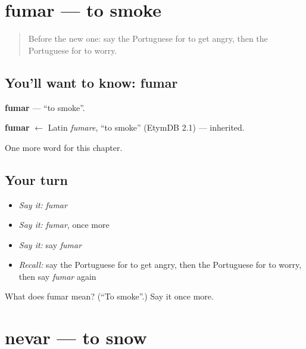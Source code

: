 \section[fumar]{fumar — to smoke}

\label{lesson:PT-C233-fumar}



\begin{quote}
Before the new one: say the Portuguese for to get angry, then the Portuguese for to worry.
\end{quote}

\subsection*{You'll want to know: fumar}
\textbf{fumar} — \textquotedblleft{}to smoke\textquotedblright{}.

\begin{cousinweb}
\textbf{fumar} $\leftarrow$ Latin \emph{fumare}, \textquotedblleft{}to smoke\textquotedblright{} (EtymDB 2.1) — inherited.
\end{cousinweb}

\begin{grammarlens}[title={What you've built}]
One more word for this chapter.
\end{grammarlens}

\subsection*{Your turn}
\begin{itemize}
\raggedright
  \item \emph{Say it:} \emph{fumar}
  \item \emph{Say it:} \emph{fumar}, once more
  \item \emph{Say it:} say \emph{fumar}
  \item \emph{Recall:} say the Portuguese for to get angry, then the Portuguese for to worry, then say \emph{fumar} again
\end{itemize}

\begin{tcolorbox}[breakable,colback=teal!4,colframe=teal!35!black,title={Before you move on}]
What does fumar mean? (\textquotedblleft{}To smoke\textquotedblright{}.) Say it once more.
\end{tcolorbox}
\section[nevar]{nevar — to snow}

